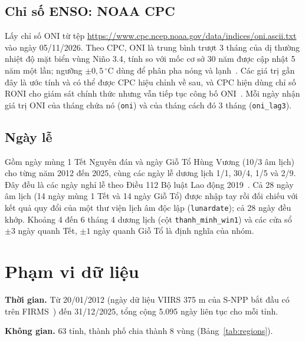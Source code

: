 \documentclass[12pt,a4paper]{article}
\begin{document}
\subsection{Chỉ số ENSO: NOAA CPC}

Lấy chỉ số ONI từ tệp \url{https://www.cpc.ncep.noaa.gov/data/indices/oni.ascii.txt} vào ngày 05/11/2026. Theo CPC, ONI là trung bình trượt 3 tháng của dị thường nhiệt độ mặt biển vùng Ni\~no 3.4, tính so với mốc cơ sở 30 năm được cập nhật 5 năm một lần; ngưỡng $\pm 0{,}5\,^\circ$C dùng để phân pha nóng và lạnh~\cite{noaaoni}. Các giá trị gần đây là ước tính và có thể được CPC hiệu chỉnh về sau, và CPC hiện dùng chỉ số RONI cho giám sát chính thức nhưng vẫn tiếp tục công bố ONI~\cite{noaaoni}. Mỗi ngày nhận giá trị ONI của tháng chứa nó (\texttt{oni}) và của tháng cách đó 3 tháng (\texttt{oni\_lag3}).

\subsection{Ngày lễ}\label{sec:holidays}

Gồm ngày mùng 1 Tết Nguyên đán và ngày Giỗ Tổ Hùng Vương (10/3 âm lịch) cho từng năm 2012 đến 2025, cùng các ngày lễ dương lịch 1/1, 30/4, 1/5 và 2/9. Đây đều là các ngày nghỉ lễ theo Điều 112 Bộ luật Lao động 2019~\cite{bllđ2019}. Cả 28 ngày âm lịch (14 ngày mùng 1 Tết và 14 ngày Giỗ Tổ) được nhập tay rồi đối chiếu với kết quả quy đổi của một thư viện lịch âm độc lập (\texttt{lunardate}); cả 28 ngày đều khớp. Khoảng 4 đến 6 tháng 4 dương lịch (cột \texttt{thanh\_minh\_win1}) và các cửa sổ $\pm 3$ ngày quanh Tết, $\pm 1$ ngày quanh Giỗ Tổ là định nghĩa của nhóm.

\section{Phạm vi dữ liệu}\label{sec:pham-vi}

\textbf{Thời gian.} Từ 20/01/2012 (ngày dữ liệu VIIRS 375 m của S-NPP bắt đầu có trên FIRMS~\cite{arset}) đến 31/12/2025, tổng cộng 5.095 ngày liên tục cho mỗi tỉnh.

\textbf{Không gian.} 63 tỉnh, thành phố chia thành 8 vùng (Bảng~\ref{tab:regions}).
\end{document}

